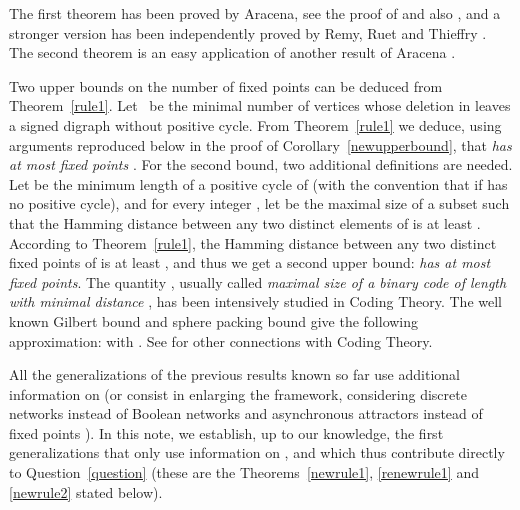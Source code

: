 \documentclass[11pt,a4paper]{article}
\begin{document}
The first theorem has been proved by Aracena, see the proof of \cite[Theorem 9]{A08} and also \cite{ADG04a}, and a stronger version has been independently proved by Remy, Ruet and Thieffry \cite[Theorem 3.2]{RRT08}. The second theorem is an easy application of another result of Aracena \cite[Theorem 6]{A08}.

\medskip
Two upper bounds on the number of fixed points can be deduced from Theorem~\ref{rule1}. Let~ be the minimal number of vertices whose deletion in  leaves a signed digraph without positive cycle. From Theorem~\ref{rule1} we deduce, using arguments reproduced below in the proof of Corollary~\ref{newupperbound}, that {\em  has at most  fixed points} \cite[Theorem 9]{A08}. For the second bound, two additional definitions are needed. Let  be the minimum length of a positive cycle of  (with the convention that  if  has no positive cycle), and for every integer , let  be the maximal size of a subset  such that the Hamming distance between any two distinct elements of  is at least . According to Theorem~\ref{rule1}, the Hamming distance between any two distinct fixed points of  is at least , and thus we get a second upper bound: {\em  has at most  fixed points}. The quantity , usually called {\em maximal size of a binary code of length  with minimal distance }, has been intensively studied in Coding Theory. The well known Gilbert bound and sphere packing bound give the following approximation:  with . See \cite{GRR15} for other connections with Coding Theory. 



\medskip
All the generalizations of the previous results known so far use additional information on  \cite{RRT08,R10} (or consist in enlarging the framework, considering discrete networks instead of Boolean networks and asynchronous attractors instead of fixed points \cite{RC07,R10}). In this note, we establish, up to our knowledge, the first generalizations that only use information on , and which thus contribute directly to Question~\ref{question} (these are the Theorems~\ref{newrule1}, \ref{renewrule1} and \ref{newrule2} stated below).
\end{document}
